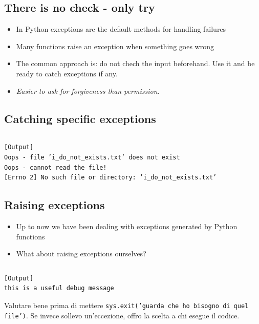   
  \subsection{There is no check - only try}
  \begin{itemize}
    \item In Python exceptions are the default methods for handling failures
    \smallskip
    \item Many functions raise an exception when something goes wrong
    \smallskip
    \item The common approach is: do not chech the input beforehand. Use it and
          be ready to catch exceptions if any.
    \smallskip
    \item \textit{Easier to ask for forgiveness than permission.} 
  \end{itemize}
  
  
\subsection{Catching specific exceptions}

\inputminted{python}{snippets/dont_ask_permission.py}
\begin{verbatim}
[Output]
Oops - file ’i_do_not_exists.txt’ does not exist
Oops - cannot read the file!
[Errno 2] No such file or directory: ’i_do_not_exists.txt’
\end{verbatim}




\subsection{Raising exceptions}
  \begin{itemize}
    \item Up to now we have been dealing with exceptions generated by Python
          functions
    \medskip
    \item What about raising exceptions ourselves?
  \end{itemize}
  
\inputminted{python}{snippets/raising.py}
\begin{verbatim}
[Output]
this is a useful debug message
\end{verbatim}

Valutare bene prima di mettere \texttt{sys.exit('guarda che ho bisogno di quel file')}. Se invece sollevo un'eccezione, offro la scelta a chi esegue il codice.\\

